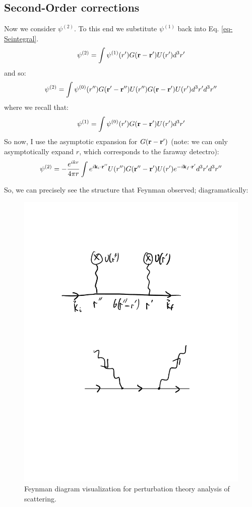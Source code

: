 \subsection{Second-Order corrections}
Now we consider $\psi^{(2)}$. To this end we substitute $\psi^{(1)}$ back into Eq. \eqref{eq-Seintegral}.
\begin{equation}
    \psi^{(2)} = \int \psi^{(1)}(r')G(\mathbf{r} - \mathbf{r}')U(r')d^3r'
\end{equation}
and so:
\begin{equation}
    \psi^{(2)} = \int \psi^{(0)}(r'') G(\mathbf{r}' - \mathbf{r}'') U(r'')G(\mathbf{r} - \mathbf{r}')U(r')d^3r' d^3r''
\end{equation}
where we recall that:
\begin{equation}
    \psi^{(1)} = \int \psi^{(0)}(r')G(\mathbf{r} - \mathbf{r}')U(r')d^3r'
\end{equation}
So now, I use the asymptotic expansion for $G(\mathbf{r} - \mathbf{r}')$ (note: we can only asymptotically expand $r$, which corresponds to the faraway detectro):
\begin{equation}
    \psi^{(2)} = -\frac{e^{ikr}}{4\pi r}\int e^{i\mathbf{k}_i \cdot \mathbf{r}''} U(r'')G(\mathbf{r}'' - \mathbf{r}')U(r') e^{-i\mathbf{k}_f \cdot \mathbf{r}'} d^3r' d^3r''
\end{equation}

So, we can precisely see the structure that Feynman observed; diagramatically:

\begin{figure}[htbp]
    \centering
    \includegraphics[scale=0.7]{Images/fig-feynmanscatter.pdf}
    \caption{Feynman diagram visualization for perturbation theory analysis of scattering.}
    \label{fig-feynmanscatter}
\end{figure}

